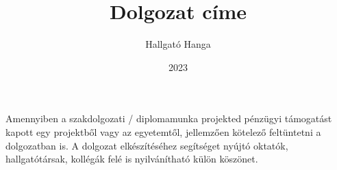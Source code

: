 \documentclass[
]{elteikthesis}[2023/04/10]
\title{Dolgozat címe} %
\date{2023} %
\author{Hallgató Hanga}
\affiliation{egyetemi tanársegéd} %
\begin{document}


\maketitle
%

\tableofcontents
\cleardoublepage


\cleardoublepage


\cleardoublepage


\cleardoublepage


\cleardoublepage

\chapter*{\acklabel}
Amennyiben a szakdolgozati / diplomamunka projekted pénzügyi támogatást kapott egy projektből vagy az egyetemtől, jellemzően kötelező feltüntetni a dolgozatban is. A dolgozat elkészítéséhez segítséget nyújtó oktatók, hallgatótársak, kollégák felé is nyilvánítható külön köszönet.

%

{}
\printbibliography[title=\biblabel]
\cleardoublepage





\end{document}
